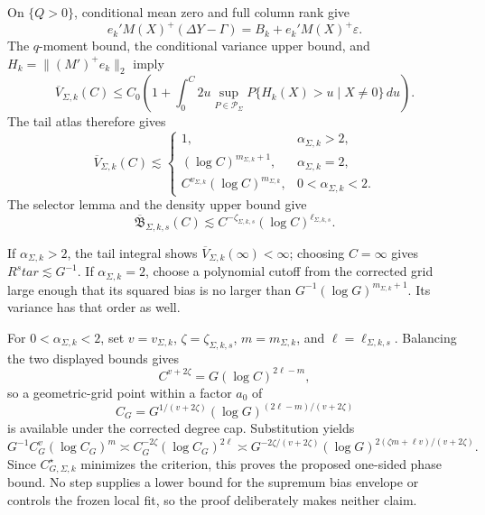 On \(\{Q>0\}\), conditional mean zero and full column rank give
\[
e_k'M(X)^+(\Delta Y-\Gamma)=B_k+e_k'M(X)^+\varepsilon.
\]
The \(q\)-moment bound, the conditional variance upper bound, and \(H_k=\|(M')^+e_k\|_2\) imply
\[
\overline V_{\Sigma,k}(C)
\le C_0\left(1+\int_0^C2u\sup_{P\in\mathcal P_\Sigma}P\{H_k(X)>u\mid X\ne0\}\,du\right).
\]
The tail atlas therefore gives
\[
\overline V_{\Sigma,k}(C)\lesssim
\begin{cases}
1,&\alpha_{\Sigma,k}>2,\\
(\log C)^{m_{\Sigma,k}+1},&\alpha_{\Sigma,k}=2,\\
C^{v_{\Sigma,k}}(\log C)^{m_{\Sigma,k}},&0<\alpha_{\Sigma,k}<2.
\end{cases}
\]
The selector lemma and the density upper bound give
\[
\overline{\mathfrak B}_{\Sigma,k,s}(C)
\lesssim C^{-\zeta_{\Sigma,k,s}}(\log C)^{\ell_{\Sigma,k,s}}.
\]

If \(\alpha_{\Sigma,k}>2\), the tail integral shows \(\overline V_{\Sigma,k}(\infty)<\infty\); choosing \(C=\infty\) gives \(R^star\lesssim G^{-1}\). If \(\alpha_{\Sigma,k}=2\), choose a polynomial cutoff from the corrected grid large enough that its squared bias is no larger than \(G^{-1}(\log G)^{m_{\Sigma,k}+1}\). Its variance has that order as well.

For \(0<\alpha_{\Sigma,k}<2\), set \(v=v_{\Sigma,k}\), \(\zeta=\zeta_{\Sigma,k,s}\), \(m=m_{\Sigma,k}\), and \(\ell=\ell_{\Sigma,k,s}\). Balancing the two displayed bounds gives
\[
C^{v+2\zeta}=G(\log C)^{2\ell-m},
\]
so a geometric-grid point within a factor \(a_0\) of
\[
C_G=G^{1/(v+2\zeta)}(\log G)^{(2\ell-m)/(v+2\zeta)}
\]
is available under the corrected degree cap. Substitution yields
\[
G^{-1}C_G^v(\log C_G)^m
\asymp C_G^{-2\zeta}(\log C_G)^{2\ell}
\asymp
G^{-2\zeta/(v+2\zeta)}
(\log G)^{2(\zeta m+\ell v)/(v+2\zeta)}.
\]
Since \(C_{G,\Sigma,k}^{\star}\) minimizes the criterion, this proves the proposed one-sided phase bound. No step supplies a lower bound for the supremum bias envelope or controls the frozen local fit, so the proof deliberately makes neither claim.